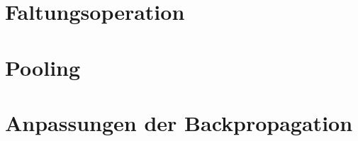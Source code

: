 \documentclass[../main.tex]{subfiles}
\begin{document}
\section{Faltungsoperation}
\section{Pooling}
\section{Anpassungen der Backpropagation}
\end{document}
